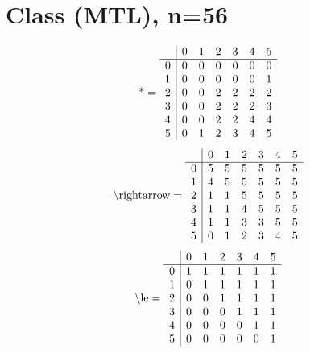 \documentclass[11pt]{article}
\begin{document}
\section{Class (MTL), n=56}
\[\text{*} = 
\begin{array}{r | r r r r r r}
 & 0 & 1 & 2 & 3 & 4 & 5 \\ \hline
0 & 0 & 0 & 0 & 0 & 0 & 0 \\
1 & 0 & 0 & 0 & 0 & 0 & 1 \\
2 & 0 & 0 & 2 & 2 & 2 & 2 \\
3 & 0 & 0 & 2 & 2 & 2 & 3 \\
4 & 0 & 0 & 2 & 2 & 4 & 4 \\
5 & 0 & 1 & 2 & 3 & 4 & 5 \\
\end{array}
\]
\[\text{\textbackslash rightarrow} = 
\begin{array}{r | r r r r r r}
 & 0 & 1 & 2 & 3 & 4 & 5 \\ \hline
0 & 5 & 5 & 5 & 5 & 5 & 5 \\
1 & 4 & 5 & 5 & 5 & 5 & 5 \\
2 & 1 & 1 & 5 & 5 & 5 & 5 \\
3 & 1 & 1 & 4 & 5 & 5 & 5 \\
4 & 1 & 1 & 3 & 3 & 5 & 5 \\
5 & 0 & 1 & 2 & 3 & 4 & 5 \\
\end{array}
\]
\[\text{\textbackslash le} = 
\begin{array}{r | r r r r r r}
 & 0 & 1 & 2 & 3 & 4 & 5 \\ \hline
0 & 1 & 1 & 1 & 1 & 1 & 1 \\
1 & 0 & 1 & 1 & 1 & 1 & 1 \\
2 & 0 & 0 & 1 & 1 & 1 & 1 \\
3 & 0 & 0 & 0 & 1 & 1 & 1 \\
4 & 0 & 0 & 0 & 0 & 1 & 1 \\
5 & 0 & 0 & 0 & 0 & 0 & 1 \\
\end{array}
\]
\end{document}
